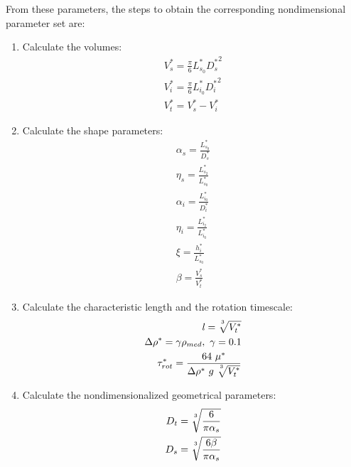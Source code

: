 \documentclass[10pt,a4paper]{article}
\def\non{\nonumber}
\def\l{\mathit{l}}
\begin{document}
From these parameters, the steps to obtain the corresponding nondimensional parameter set are:
\begin{enumerate}
	\item Calculate the volumes:
	\begin{eqnarray}\label{d2ndpars2}
		V_s^* = \frac{\pi}{6} L_{s_0}^* {D_s^*}^2 \non \\
		V_i^* = \frac{\pi}{6} L_{i_0}^* {D_i^*}^2 \non \\
		V_t^* = V_s^* - V_i^* 
	\end{eqnarray}
	\item Calculate the shape parameters: %
	\begin{eqnarray}\label{d2ndpars1}
		\alpha_s = \frac{L^*_{s_0}}{D^*_s} \non \\
		\eta_s = \frac{L^*_{s_2}}{L^*_{s_0}} \non \\
		\alpha_{i} = \frac{L^*_{i_0}}{D^*_i} \non \\
		\eta_{i} = \frac{L^*_{i_2}}{L^*_{i_0}} \non \\
		\xi = \frac{h_i^*}{L_{s_0}^*} \non \\
		\beta = \frac{V_s^*}{V_t^*}
	\end{eqnarray}
	\item Calculate the characteristic length and the rotation timescale:
	\begin{eqnarray}\label{d2ndpars3}
		\l = \sqrt[\uproot{5}3]{V_t^*} \non \\
		\Delta \rho^* = \gamma \rho_{med}, ~ \gamma = 0.1 \non \\
		\tau^*_{rot} = \frac{64 ~ \mu^*}{\Delta \rho^* ~ g ~ \sqrt[\uproot{5}3]{V_t^*}}
	\end{eqnarray}
	\item Calculate the nondimensionalized geometrical parameters:
	\begin{eqnarray}\label{d2ndpars4a}
		D_t = \sqrt[\uproot{5}3]{\frac{6}{\pi \alpha_s}} \non \\
		D_s = \sqrt[\uproot{5}3]{\frac{6 \beta}{\pi \alpha_s}} \non \\

\end{eqnarray}
\end{enumerate}
\end{document}
